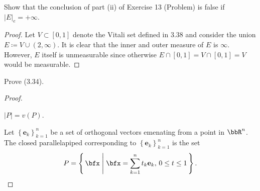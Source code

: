 \begin{problem}
Show that the conclusion of part  (ii) of Exercise 13 (Problem) is false if
$\left|E\right|_e=+\infty$.
\end{problem}
\begin{proof}
Let $V\subset[0,1]$ denote the Vitali set defined in 3.38 and consider the
union $E\coloneqq V\cup(2,\infty)$. It is clear that the inner and outer
measure of $E$ is $\infty$. However, $E$ itself is unmeasurable since
otherwise $E\cap[0,1]=V\cap[0,1]=V$ would be measurable.
\end{proof}
\newpage

\begin{problem}
Prove (3.34).
\end{problem}
\begin{proof}
\begin{lemma*}
$\left|P\right|=v(P)$.
\end{lemma*}
Let $\left\{\mathbf{e}_k\right\}_{k=1}^n$ be a set of orthogonal vectors
emenating from a point in $\bbR^n$. The closed parallelapiped corresponding
to $\left\{\mathbf{e}_k\right\}_{k=1}^n$ is the set
\begin{equation}
\label{eq:closed-parallelapiped}
P=
\left\{\,\bfx\;\middle|\;
\text{$\bfx=\sum_{k=1}^nt_k\mathbf{e}_k$, $0\leq t\leq 1$}\,\right\}.
\end{equation}
\end{proof}
\newpage

